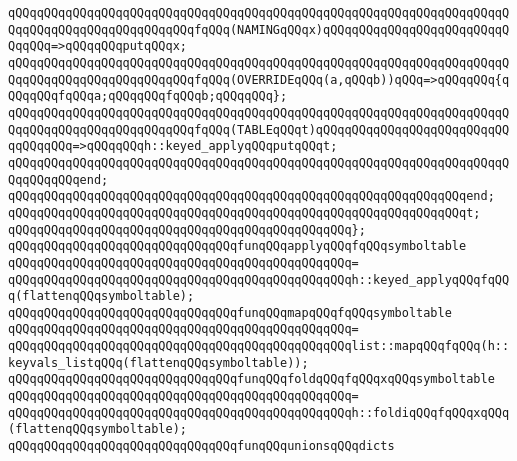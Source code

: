 \verb|qQQqqQQqqQQqqQQqqQQqqQQqqQQqqQQqqQQqqQQqqQQqqQQqqQQqqQQqqQQqqQQqqQQqqQQqqQQqqQQqqQQqqQQqqQQqqQQqfqQQq(NAMINGqQQqx)qQQqqQQqqQQqqQQqqQQqqQQqqQQqqQQq=>qQQqqQQqputqQQqx;|\newline
\verb|qQQqqQQqqQQqqQQqqQQqqQQqqQQqqQQqqQQqqQQqqQQqqQQqqQQqqQQqqQQqqQQqqQQqqQQqqQQqqQQqqQQqqQQqqQQqqQQqfqQQq(OVERRIDEqQQq(a,qQQqb))qQQq=>qQQqqQQq{qQQqqQQqfqQQqa;qQQqqQQqfqQQqb;qQQqqQQq};|\newline
\verb|qQQqqQQqqQQqqQQqqQQqqQQqqQQqqQQqqQQqqQQqqQQqqQQqqQQqqQQqqQQqqQQqqQQqqQQqqQQqqQQqqQQqqQQqqQQqqQQqfqQQq(TABLEqQQqt)qQQqqQQqqQQqqQQqqQQqqQQqqQQqqQQqqQQq=>qQQqqQQqh::keyed_applyqQQqputqQQqt;|\newline
\verb|qQQqqQQqqQQqqQQqqQQqqQQqqQQqqQQqqQQqqQQqqQQqqQQqqQQqqQQqqQQqqQQqqQQqqQQqqQQqqQQqend;|\newline
\verb|qQQqqQQqqQQqqQQqqQQqqQQqqQQqqQQqqQQqqQQqqQQqqQQqqQQqqQQqqQQqqQQqend;|\newline
\newline
\verb|qQQqqQQqqQQqqQQqqQQqqQQqqQQqqQQqqQQqqQQqqQQqqQQqqQQqqQQqqQQqqQQqt;|\newline
\verb|qQQqqQQqqQQqqQQqqQQqqQQqqQQqqQQqqQQqqQQqqQQqqQQq};|\newline
\newline
\verb|qQQqqQQqqQQqqQQqqQQqqQQqqQQqqQQqfunqQQqapplyqQQqfqQQqsymboltable|\newline
\verb|qQQqqQQqqQQqqQQqqQQqqQQqqQQqqQQqqQQqqQQqqQQqqQQq=|\newline
\verb|qQQqqQQqqQQqqQQqqQQqqQQqqQQqqQQqqQQqqQQqqQQqqQQqh::keyed_applyqQQqfqQQq(flattenqQQqsymboltable);|\newline
\newline
\verb|qQQqqQQqqQQqqQQqqQQqqQQqqQQqqQQqfunqQQqmapqQQqfqQQqsymboltable|\newline
\verb|qQQqqQQqqQQqqQQqqQQqqQQqqQQqqQQqqQQqqQQqqQQqqQQq=|\newline
\verb|qQQqqQQqqQQqqQQqqQQqqQQqqQQqqQQqqQQqqQQqqQQqqQQqlist::mapqQQqfqQQq(h::keyvals_listqQQq(flattenqQQqsymboltable));|\newline
\newline
\verb|qQQqqQQqqQQqqQQqqQQqqQQqqQQqqQQqfunqQQqfoldqQQqfqQQqxqQQqsymboltable|\newline
\verb|qQQqqQQqqQQqqQQqqQQqqQQqqQQqqQQqqQQqqQQqqQQqqQQq=|\newline
\verb|qQQqqQQqqQQqqQQqqQQqqQQqqQQqqQQqqQQqqQQqqQQqqQQqh::foldiqQQqfqQQqxqQQq(flattenqQQqsymboltable);|\newline
\newline
\verb|qQQqqQQqqQQqqQQqqQQqqQQqqQQqqQQqfunqQQqunionsqQQqdicts|\newline
